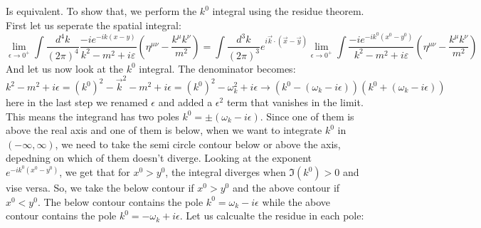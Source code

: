 \documentclass{article}
\begin{document}
Is equivalent. To show that, we perform the $k^0$ integral using the residue theorem. First let us seperate the spatial integral:
\begin{equation}
    \lim_{\epsilon\rightarrow0^{+}} \int \frac{d^4k}{(2\pi)^4}\frac{-ie^{-ik(x-y)}}{k^2 - m^2 + i\varepsilon}\left(\eta^{\mu\nu} - \frac{k^\mu k^\nu}{m^2}\right) = 
    \int \frac{d^3k}{(2\pi)^3} e^{i\vec{k}\cdot(\vec{x} - \vec{y})} \lim_{\epsilon\rightarrow0^{+}} \int \frac{-ie^{-ik^0(x^0-y^0)}}{k^2 - m^2 + i\varepsilon}\left(\eta^{\mu\nu} - \frac{k^\mu k^\nu}{m^2}\right)
\end{equation}
And let us now look at the $k^0$ integral. The denominator becomes:
\begin{equation}
    k^2 - m^2 + i\epsilon = \left(k^0\right)^2 - \vec{k}^2 - m^2 + i\epsilon = \left(k^0\right)^2 - \omega_k^2 + i\epsilon \rightarrow \left(k^0 - (\omega_k - i\epsilon)\right)\left(k^0 + (\omega_k - i\epsilon)\right)
\end{equation}
here in the last step we renamed $\epsilon$ and added a $\epsilon^2$ term that vanishes in the limit. This means the integrand has two poles $k^0 = \pm \left(\omega_k - i\epsilon\right)$. Since one of them is above the real axis and one of them is below, when we want to integrate $k^0$ in $(-\infty, \infty)$, we need to take the semi circle contour below or above the axis, depedning on which of them doesn't diverge. Looking at the exponent $e^{-ik^0(x^0 - y^0)}$, we get that for $x^0 > y^0$, the integral diverges when $\Im(k^0) > 0$ and vise versa. So, we take the below contour if $x^0 > y^0$ and the above contour if $x^0 < y^0$. The below contour contains the pole $k^0 = \omega_k - i\epsilon$ while the above contour contains the pole $k^0 = - \omega_k + i\epsilon$. Let us calcualte the residue in each pole:
\end{document}
